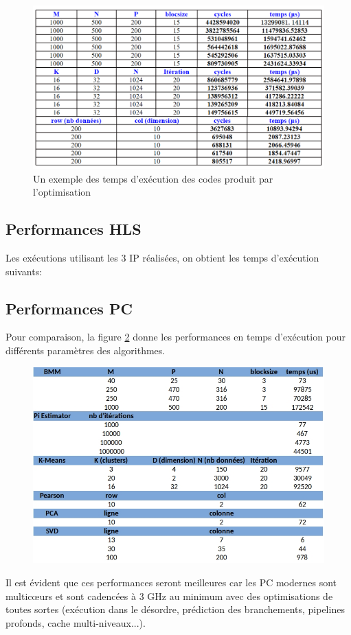 \documentclass[12pt,a4paper]{ieee}
\begin{document}
\begin{figure}[H]
	\centering
	\includegraphics[width=\linewidth]{soft/screenshot007}
	\caption{Un exemple des temps d'exécution des codes produit par l'optimisation}
	\label{fig:screenshot007}
\end{figure}


\subsection{Performances HLS}
Les exécutions utilisant les 3 IP réalisées, on obtient les temps d'exécution  suivants:

\subsection{Performances PC}
Pour comparaison, la figure \ref{fig:timepc} donne les performances en temps d'exécution pour différents paramètres des algorithmes.
\begin{figure}[H]
	\centering
	\includegraphics[width=0.8\linewidth]{soft/time_pc}
	\caption{}
	\label{fig:timepc}
\end{figure}
Il est évident que ces performances seront meilleures car les PC modernes sont multicœurs et sont cadencées à 3 GHz au minimum avec des optimisations de toutes sortes (exécution dans le désordre, prédiction des branchements, pipelines profonds, cache multi-niveaux...).
\end{document}
